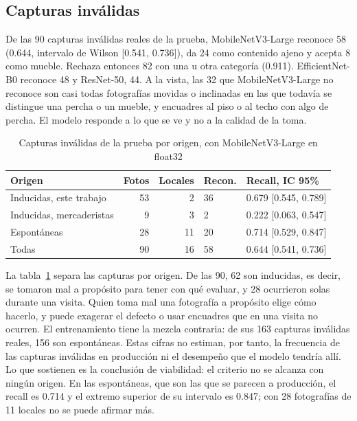 \documentclass[conference]{IEEEtran}
\begin{document}
\subsection{Capturas inválidas}
\label{sec:invalidas}

De las 90 capturas inválidas reales de la prueba, MobileNetV3-Large reconoce 58 (0.644, intervalo de Wilson
[0.541, 0.736]), da 24 como contenido ajeno y acepta 8 como mueble. Rechaza entonces 82 con una u otra categoría
(0.911). EfficientNet-B0 reconoce 48 y ResNet-50, 44. A la vista, las 32 que MobileNetV3-Large no reconoce son casi
todas fotografías movidas o inclinadas en las que todavía se distingue una percha o un mueble, y encuadres al piso
o al techo con algo de percha. El modelo responde a lo que se ve y no a la calidad de la toma.

\begin{table}[t]
\caption{Capturas inválidas de la prueba por origen, con MobileNetV3-Large en float32}
\label{tab:origen}
\centering
\setlength{\tabcolsep}{3pt}
\begin{tabular}{@{}lrrll@{}}
\toprule
Origen & Fotos & Locales & Recon. & Recall, IC 95\% \\
\midrule
Inducidas, este trabajo & 53 & 2 & 36 & 0.679 [0.545, 0.789] \\
Inducidas, mercaderistas & 9 & 3 & 2 & 0.222 [0.063, 0.547] \\
Espontáneas & 28 & 11 & 20 & 0.714 [0.529, 0.847] \\
\midrule
Todas & 90 & 16 & 58 & 0.644 [0.541, 0.736] \\
\bottomrule
\end{tabular}
\end{table}

La tabla~\ref{tab:origen} separa las capturas por origen. De las 90, 62 son inducidas, es decir, se tomaron mal a
propósito para tener con qué evaluar, y 28 ocurrieron solas durante una visita. Quien toma mal una fotografía a
propósito elige cómo hacerlo, y puede exagerar el defecto o usar encuadres que en una visita no ocurren. El
entrenamiento tiene la mezcla contraria: de sus 163 capturas inválidas reales, 156 son espontáneas. Estas cifras
no estiman, por tanto, la frecuencia de las capturas inválidas en producción ni el desempeño que el modelo tendría
allí. Lo que sostienen es la conclusión de viabilidad: el criterio no se alcanza con ningún origen. En las
espontáneas, que son las que se parecen a producción, el recall es 0.714 y el extremo superior de su intervalo es
0.847; con 28 fotografías de 11 locales no se puede afirmar más.
\end{document}
